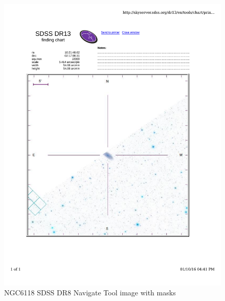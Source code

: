 \documentclass[10pt,letterpaper]{article}
\begin{document}
\begin{figure}[h!]
\centering
\includegraphics[scale=0.7]{figures/NGC6118.pdf}
\caption{NGC6118 SDSS DR8 Navigate Tool image with masks}
\end{figure}
\end{document}
